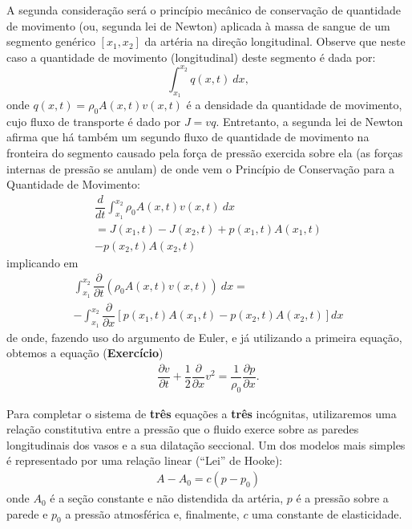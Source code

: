 A segunda consideração será o princípio mecânico de conservação de quantidade de movimento (ou, segunda lei de Newton) aplicada à massa de sangue de um segmento genérico \([x_1, x_2]\) da artéria na direção longitudinal. Observe que neste caso a quantidade de movimento (longitudinal) deste segmento é dada por:
\begin{equation}
\int_{x_1}^{x_2} q(x,t)\ dx,
\end{equation}
onde \(q(x,t) = \rho_0 A(x,t) v(x,t)\) é a densidade da quantidade de movimento, cujo fluxo de transporte é dado por \(J = vq\). Entretanto, a segunda lei de Newton afirma que há também um segundo fluxo de quantidade de movimento na fronteira do segmento causado pela força de pressão exercida sobre ela (as forças internas de pressão se anulam) de onde vem o Princípio de Conservação para a Quantidade de Movimento:
\begin{eqnarray}
\dfrac{d}{dt} \int_{x_1}^{x_2} \rho_0 A(x,t) v(x,t)\ dx \\
= J(x_1,t) - J(x_2,t) + p(x_1,t) A(x_1,t) \\
  - p(x_2,t) A(x_2,t)
\end{eqnarray}
implicando em
\begin{eqnarray}
\int_{x_1}^{x_2} \dfrac{\partial}{\partial t} (\rho_0 A(x,t) v(x,t))\ dx = \\
-\int_{x_1}^{x_2} \dfrac{\partial}{\partial x} \left[p(x_1,t) A(x_1,t) - p(x_2,t) A(x_2,t)\right] dx
\end{eqnarray}
de onde, fazendo uso do argumento de Euler, e já utilizando a primeira equação, obtemos a equação (\textbf{Exercício})
\begin{eqnarray}
\dfrac{\partial v}{\partial t} + \dfrac{1}{2} \dfrac{\partial}{\partial x} v^2 = \dfrac{1}{\rho_0} \dfrac{\partial p}{\partial x}.
\end{eqnarray}

Para completar o sistema de \textbf{três} equações a \textbf{três} incógnitas, utilizaremos uma relação constitutiva entre a pressão que o fluido exerce sobre as paredes longitudinais dos vasos e a sua dilatação seccional. Um dos modelos mais simples é representado por uma relação linear (``Lei'' de Hooke):
\begin{eqnarray}\label{eq:III}
A - A_0 = c(p - p_0)
\end{eqnarray}
onde \(A_0\) é a seção constante e não distendida da artéria, \(p\) é a pressão sobre a parede e \(p_0\) a pressão atmosférica e, finalmente, \(c\) uma constante de elasticidade.

